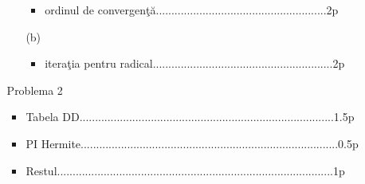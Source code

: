 \documentclass{article}%
\begin{document}
\begin{enumerate}
\begin{enumerate}
\begin{enumerate}
\begin{itemize}
\item ordinul de convergen\c{t}\u{a}.......................................................2p
\end{itemize}

\item[(b)] 

\begin{itemize}
\item itera\c{t}ia pentru radical..........................................................2p
\end{itemize}
\end{enumerate}

\item[Problema 2] 

\begin{itemize}
\item Tabela DD..................................................................................1.5p

\item PI Hermite...................................................................................0.5p

\item Restul.........................................................................................1p
\end{itemize}
\end{enumerate}
\end{enumerate}
\end{document}
